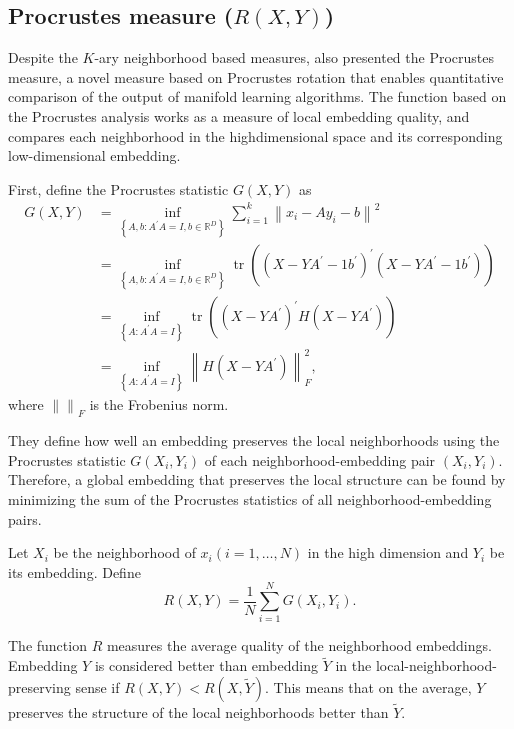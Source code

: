 \documentclass[11pt,a4paper,]{article}
\begin{document}
\hypertarget{procrustes-measure-rxy}{%
\subsection{\texorpdfstring{Procrustes measure (\(R(X,Y)\))}{Procrustes measure (R(X,Y))}}\label{procrustes-measure-rxy}}

Despite the \(K\)-ary neighborhood based measures, \textcite{Goldberg2009-tb} also presented the Procrustes measure, a novel measure based on Procrustes rotation that enables quantitative comparison of the output of manifold learning algorithms. The function based on the Procrustes analysis works as a measure of local embedding quality, and compares each neighborhood in the highdimensional space and its corresponding low-dimensional embedding.

First, define the Procrustes statistic \(G(X, Y)\) as
\[
\begin{aligned}
G(X, Y) &= \inf _{\left\{A, b: A^{\prime} A=I, b \in \mathbb{R}^{D}\right\}} \sum_{i=1}^{k}\left\|x_{i}-A y_{i}-b\right\|^{2} \\
&= \inf _{\left\{A, b: A^{\prime} A=I, b \in \mathbb{R}^{D}\right\}} \operatorname{tr}\left(\left(X-Y A^{\prime}-1 b^{\prime}\right)^{\prime}\left(X-Y A^{\prime}-1 b^{\prime}\right)\right) \\
&= \inf _{\left\{A: A^{\prime} A=I\right\}} \operatorname{tr}\left(\left(X-Y A^{\prime}\right)^{\prime} H\left(X-Y A^{\prime}\right)\right) \\
&= \inf _{\left\{A: A^{\prime} A=I\right\}}\left\|H\left(X-Y A^{\prime}\right)\right\|_{F}^{2},
\end{aligned}
\]
where \(\left\| \right\|_{F}\) is the Frobenius norm.

They define how well an embedding preserves the local neighborhoods using the Procrustes statistic \(G(X_i,Y_i)\) of each neighborhood-embedding pair \((X_i,Y_i)\). Therefore, a global embedding that preserves
the local structure can be found by minimizing the sum of the Procrustes statistics of all neighborhood-embedding pairs.

Let \(X_{i}\) be the neighborhood of \(x_{i}(i=1, \ldots, N)\) in the high dimension and \(Y_{i}\) be its embedding. Define
\[
R(X, Y)=\frac{1}{N} \sum_{i=1}^{N} G \left(X_{i}, Y_{i}\right).
\]

The function \(R\) measures the average quality of the neighborhood embeddings. Embedding \(Y\) is considered better than embedding \(\tilde{Y}\) in the local-neighborhood-preserving sense if \(R(X, Y) < R(X, \tilde{Y})\). This means that on the average, \(Y\) preserves the structure of the local neighborhoods better than \(\tilde{Y}\).
\end{document}

